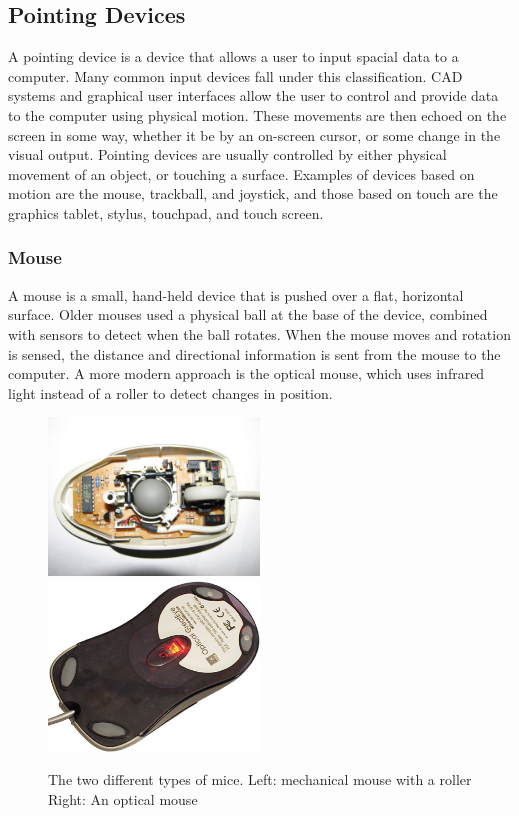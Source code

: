 \documentclass[11pt]{report}
\begin{document}
\subsection{Pointing Devices}
 A pointing device is a device that allows a user to input spacial data to a computer. 
 Many common input devices fall under this classification. 
 CAD systems and graphical user interfaces allow the user to control and provide data to the computer using physical motion.
 These movements are then echoed on the screen in some way, whether it be by an on-screen cursor, or some change in the visual output.
 Pointing devices are usually controlled by either physical movement of an object, or touching a surface.
 Examples of devices based on motion are the mouse, trackball, and joystick, and those based on touch are the graphics tablet, stylus, touchpad, and touch screen.
 
 \subsubsection{Mouse}
 A mouse is a small, hand-held device that is pushed over a flat, horizontal surface.
 Older mouses used a physical ball at the base of the device, combined with sensors to detect when the ball rotates.
 When the mouse moves and rotation is sensed, the distance and directional information is sent from the mouse to the computer.
 A more modern approach is the optical mouse, which uses infrared light instead of a roller to detect changes in position.
 
 \begin{figure}
 \includegraphics[width=0.5\textwidth]{mechmouse}
 \includegraphics[width=0.5\textwidth]{opticalmouse}
 \caption{The two different types of mice. Left: mechanical mouse with a roller Right: An optical mouse}
 \end{figure}
 
\end{document}
